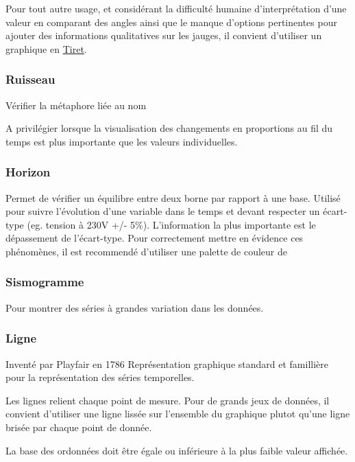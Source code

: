 \documentclass[a4paper,12pt]{article}
\begin{document}
\begin{multicols}{2}
Pour tout autre usage, et considérant la difficulté humaine d'interprétation d'une valeur en comparant des angles ainsi que le manque d'options pertinentes pour ajouter des informations qualitatives sur les jauges, il convient d'utiliser un graphique en \hyperref[sec:orge7b1993]{Tiret}.
\subsubsection*{Ruisseau}
\label{sec:org07efa85}
Vérifier la métaphore liée au nom

A privilégier lorsque la visualisation des changements en proportions au fil du temps est plus importante que les valeurs individuelles. \autocite{alansmithLexiqueVisuel}
\subsubsection*{Horizon}
\label{sec:org18232df}
Permet de vérifier un équilibre entre deux borne par rapport à une base. \autocite{alansmithLexiqueVisuel}  Utilisé pour suivre l'évolution d'une variable dans le temps et devant respecter un écart-type (eg. tension à 230V +/- 5\%). L'information la plus importante est le dépassement de l'écart-type. Pour correctement mettre en évidence ces phénomènes, il est recommendé d'utiliser une palette de couleur de
\subsubsection*{Sismogramme}
\label{sec:org2a94455}
Pour montrer des séries à grandes variation dans les données. \autocite{alansmithLexiqueVisuel}
\subsubsection*{Ligne}
\label{sec:orgbf0d8ff}
Inventé par Playfair en 1786 \autocite{sosulskiBecomingVisual2019}
Représentation graphique standard et famillière pour la représentation des séries temporelles. \autocite[,@Schwabish2021p86]{alansmithLexiqueVisuel}

Les lignes relient chaque point de mesure. Pour de grands jeux de données, il convient d'utiliser une ligne lissée sur l'ensemble du graphique plutot qu'une ligne brisée par chaque point de donnée. \autocite{wilkeDirectoryVisualizations2019}

La base des ordonnées doit être égale ou inférieure à la plus faible valeur affichée. \autocite{wongWallStreetJournal2010}


\end{multicols}
\end{document}
